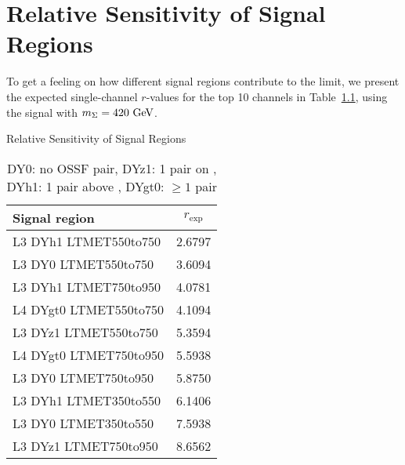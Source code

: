 \chapter{Relative Sensitivity of Signal Regions}
To get a feeling on how different signal regions contribute to the limit, we present the expected single-channel $r$-values for the top 10 channels in Table~\ref{tab:topSensitivity}, using the signal with $m_\Sigma = 420\,\,\text{Ge\hspace{-.08em}V}$.

\begin{table}[h]
\centering
\caption{Relative Sensitivity of Signal Regions} \label{tab:topSensitivity}
\caption*{DY0: no OSSF pair, DYz1: 1 pair on \Z,\\ DYh1: 1 pair above \Z, DYgt0: $\geq 1$ pair}
\begin{tabular}{l c}
\hline\hline
Signal region & $r_\textrm{exp}$\\
\hline
L3 DYh1 LTMET550to750 & 2.6797\\
L3 DY0 LTMET550to750 & 3.6094\\
L3 DYh1 LTMET750to950 & 4.0781\\
L4 DYgt0 LTMET550to750 & 4.1094\\
L3 DYz1 LTMET550to750 & 5.3594\\
\hline
L4 DYgt0 LTMET750to950 & 5.5938\\
L3 DY0 LTMET750to950 & 5.8750\\
L3 DYh1 LTMET350to550 & 6.1406\\
L3 DY0 LTMET350to550 & 7.5938\\
L3 DYz1 LTMET750to950 & 8.6562\\
\end{tabular}
\end{table}
